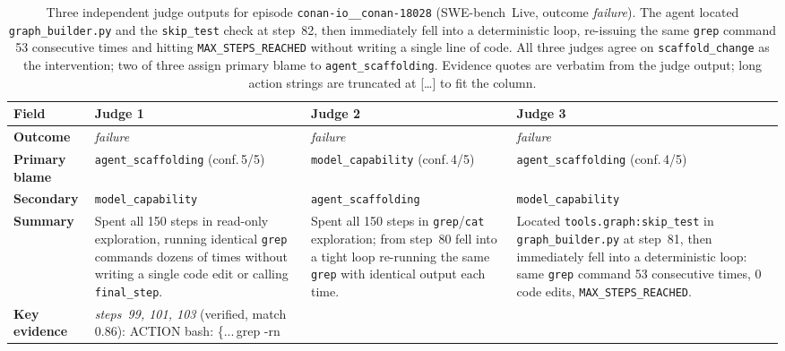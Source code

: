 \documentclass{article}
\begin{document}
\begin{table}[t]
\centering
\caption{%
  Three independent judge outputs for episode
  \texttt{conan-io\_\_conan-18028} (SWE-bench~Live, outcome \emph{failure}).
  The agent located \texttt{graph\_builder.py} and the \texttt{skip\_test}
  check at step~82, then immediately fell into a deterministic loop,
  re-issuing the same \texttt{grep} command 53 consecutive times and hitting
  \texttt{MAX\_STEPS\_REACHED} without writing a single line of code.
  All three judges agree on \texttt{scaffold\_change} as the intervention;
  two of three assign primary blame to \texttt{agent\_scaffolding}.
  Evidence quotes are verbatim from the judge output; long action strings
  are truncated at [\ldots] to fit the column.
}
\label{tab:judge-case-conan-18028}
\scriptsize
\setlength{\tabcolsep}{4pt}
\renewcommand{\arraystretch}{1.4}
\begin{tabularx}{\linewidth}{@{} >{\bfseries\RaggedRight}p{2.0cm}
                                  >{\RaggedRight\arraybackslash}X
                                  >{\RaggedRight\arraybackslash}X
                                  >{\RaggedRight\arraybackslash}X @{}}
\toprule
Field & Judge 1 & Judge 2 & Judge 3 \\
\midrule
\rowcolor{rowgray}
Outcome & \emph{failure} & \emph{failure} & \emph{failure} \\
Primary blame
  & \texttt{agent\_scaffolding} (conf.\,5/5)
  & \texttt{model\_capability} (conf.\,4/5)
  & \texttt{agent\_scaffolding} (conf.\,4/5) \\
\rowcolor{rowgray}
Secondary & \texttt{model\_capability} & \texttt{agent\_scaffolding} & \texttt{model\_capability} \\
Summary
  & Spent all 150 steps in read-only exploration, running identical
    \texttt{grep} commands dozens of times without writing a single code
    edit or calling \texttt{final\_step}.
  & Spent all 150 steps in \texttt{grep}/\texttt{cat} exploration; from
    step~80 fell into a tight loop re-running the same \texttt{grep} with
    identical output each time.
  & Located \texttt{tools.graph:skip\_test} in \texttt{graph\_builder.py}
    at step~81, then immediately fell into a deterministic loop: same
    \texttt{grep} command 53 consecutive times, 0 code edits,
    \texttt{MAX\_STEPS\_REACHED}. \\
\rowcolor{rowgray}
Key evidence
  & \textit{steps~99, 101, 103} (verified, match\,0.86):\newline
    {\ttfamily ACTION bash: \{...\,grep -rn\newline
}
\end{tabularx}
\end{table}
\end{document}
